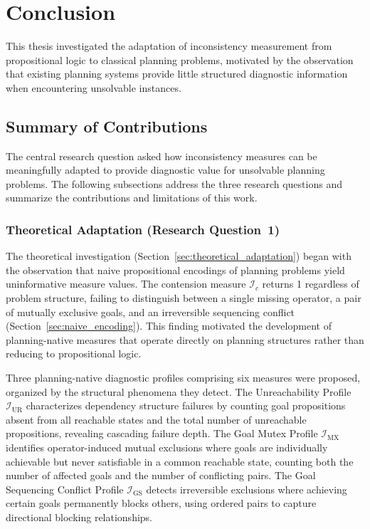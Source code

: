 \section{Conclusion}
\label{sec:conclusion}

This thesis investigated the adaptation of inconsistency measurement from propositional logic to classical planning problems, motivated by the observation that existing planning systems provide little structured diagnostic information when encountering unsolvable instances.

\subsection{Summary of Contributions}

The central research question asked how inconsistency measures can be meaningfully adapted to provide diagnostic value for unsolvable planning problems. The following subsections address the three research questions and summarize the contributions and limitations of this work.

\subsubsection{Theoretical Adaptation (Research Question~1)}

The theoretical investigation (Section~\ref{sec:theoretical_adaptation}) began with the observation that naive pro\-positional encodings of planning problems yield uninformative measure values. The contension measure $\mathcal{I}_c$ returns 1 regardless of problem structure, failing to distinguish between a single missing operator, a pair of mutually exclusive goals, and an irreversible sequencing conflict (Section~\ref{sec:naive_encoding}). This finding motivated the development of planning-native measures that operate directly on planning structures rather than reducing to propositional logic.

Three planning-native diagnostic profiles comprising six measures were proposed, organized by the structural phenomena they detect. The Unreachability Profile $\mathcal{I}_{\text{UR}}$ characterizes dependency structure failures by counting goal propositions absent from all reachable states and the total number of unreachable propositions, revealing cascading failure depth. The Goal Mutex Profile $\mathcal{I}_{\text{MX}}$ identifies operator-induced mutual exclusions where goals are individually achievable but never satisfiable in a common reachable state, counting both the number of affected goals and the number of conflicting pairs. The Goal Sequencing Conflict Profile $\mathcal{I}_{\text{GS}}$ detects irreversible exclusions where achieving certain goals permanently blocks others, using ordered pairs to capture directional blocking relationships.

